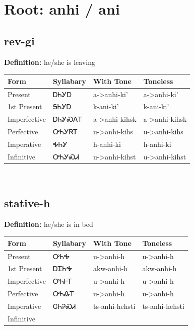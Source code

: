 \documentclass{article}%
\begin{document}
%
\normalsize%
\section*{Root: anhi / ani}%
\subsection*{rev-gi}%
\textbf{Definition: }%
he/she is leaving%
\\[0.5em]%
\begin{tabular}{|l|l|l|l|}%
\hline%
\textbf{Form}&\textbf{Syllabary}&\textbf{With Tone}&\textbf{Toneless}\\%
\hline%
Present&ᎠᏂᎩᎠ&a{-}>anhi{-}ki'&a{-}>anhi{-}ki'\\%
1st Present&ᎦᏂᎩᎠ&k{-}ani{-}ki'&k{-}ani{-}ki'\\%
Imperfective&ᎠᏂᎩᏍᎪᎢ&a{-}>anhi{-}kihsk&a{-}>anhi{-}kihsk\\%
Perfective&ᎤᏂᎩᏒᎢ&u{-}>anhi{-}kihs&u{-}>anhi{-}kihs\\%
Imperative&ᎭᏂᎩ&h{-}anhi{-}ki&h{-}anhi{-}ki\\%
Infinitive&ᎤᏂᎩᏍᏗ&u{-}>anhi{-}kihst&u{-}>anhi{-}kihst\\%
\hline%
\end{tabular}%
\\[1em]%
\subsection*{stative-h}%
\textbf{Definition: }%
he/she is in bed%
\\[0.5em]%
\begin{tabular}{|l|l|l|l|}%
\hline%
\textbf{Form}&\textbf{Syllabary}&\textbf{With Tone}&\textbf{Toneless}\\%
\hline%
Present&ᎤᏂᎭ&u{-}>anhi{-}h&u{-}>anhi{-}h\\%
1st Present&ᎠᏆᏂᎭ&akw{-}anhi{-}h&akw{-}anhi{-}h\\%
Imperfective&ᎤᏂᎰᎢ&u{-}>anhi{-}h&u{-}>anhi{-}h\\%
Perfective&ᎤᏂᎲᎢ&u{-}>anhi{-}h&u{-}>anhi{-}h\\%
Imperative&ᏣᏂᎮᏍᏗ&ts{-}anhi{-}hehsti&ts{-}anhi{-}hehsti\\%
Infinitive&&&\\%
\hline%
\end{tabular}%
\\[1em]%
\end{document}
